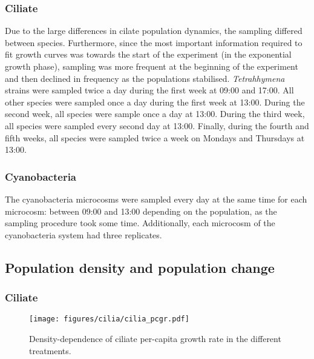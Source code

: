 \documentclass[
  letterpaper,
  DIV=11,
  numbers=noendperiod]{scrartcl}
\begin{document}
\subsubsection{Ciliate}\label{ciliate}

Due to the large differences in cilate population dynamics, the sampling
differed between species. Furthermore, since the most important
information required to fit growth curves was towards the start of the
experiment (in the exponential growth phase), sampling was more frequent
at the beginning of the experiment and then declined in frequency as the
populations stabilised. \emph{Tetrahhymena} strains were sampled twice a
day during the first week at 09:00 and 17:00. All other species were
sampled once a day during the first week at 13:00. During the second
week, all species were sample once a day at 13:00. During the third
week, all species were sampled every second day at 13:00. Finally,
during the fourth and fifth weeks, all species were sampled twice a week
on Mondays and Thursdays at 13:00.

\subsubsection{Cyanobacteria}\label{cyanobacteria}

The cyanobacteria microcosms were sampled every day at the same time for
each microcosm: between 09:00 and 13:00 depending on the population, as
the sampling procedure took some time. Additionally, each microcosm of
the cyanobacteria system had three replicates.

\subsection{Population density and population
change}\label{population-density-and-population-change}

\subsubsection{Ciliate}\label{ciliate-1}

\begin{figure}

{\centering \texttt{[image: figures/cilia/cilia\_pcgr.pdf]}

}

\caption{\label{fig-cilia_pcgr}Density-dependence of ciliate per-capita
growth rate in the different treatments.}

\end{figure}
\end{document}
